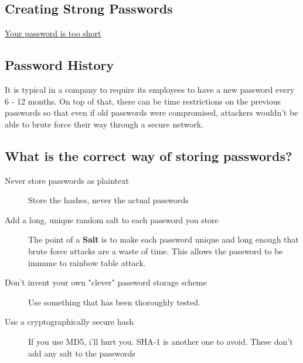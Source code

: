 \documentclass[a4paper, titlepage]{article}
\begin{document}
\subsection{Creating Strong Passwords}
\href{http://blog.codinghorror.com/your-password-is-too-damn-short/}{Your password is too short}

\subsection{Password History}

It is typical in a company to require its employees to have a new password every 6 - 12 months. On top of that, there can be time restrictions on the previous passwords so that even if old passwords were compromised, attackers wouldn't be able to brute force their way through a secure network.

\subsection{What is the correct way of storing passwords?}
\begin{description}
    \item [Never store passwords as plaintext] Store the hashes, never the actual passwords
    \item [Add a long, unique random salt to each password you store] The point of a \textbf{Salt} is to make each password unique and long enough that brute force attacks are a waste of time. This allows the password to be immune to rainbow table attack.
    \item [Don't invent your own "clever" password storage scheme] Use something that has been thoroughly tested.
    \item [Use a cryptographically secure hash] If you use MD5, i'll hurt you. SHA-1 is another one to avoid. These don't add any salt to the passwords
\end{description}
\end{document}
